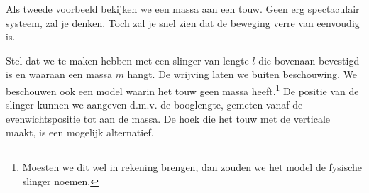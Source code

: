 \documentclass{ximera}
\begin{document}
	\author{Bart Lambregs}
    \xmsource\xmuitleg






	Als tweede voorbeeld bekijken we een massa aan een touw. Geen erg spectaculair systeem, zal je denken. Toch zal je snel zien dat de beweging verre van eenvoudig is.
	
	Stel dat we te maken hebben met een slinger van lengte $l$ die bovenaan bevestigd is en waaraan een massa $m$ hangt. De wrijving laten we buiten beschouwing. We beschouwen ook een model waarin het touw geen massa heeft.\footnote{Moesten we dit wel in rekening brengen, dan zouden we het model de fysische slinger noemen.} De positie van de slinger kunnen we aangeven d.m.v. de booglengte, gemeten vanaf de evenwichtspositie tot aan de massa. De hoek die het touw met de verticale maakt, is een mogelijk alternatief. 
	
\end{document}
